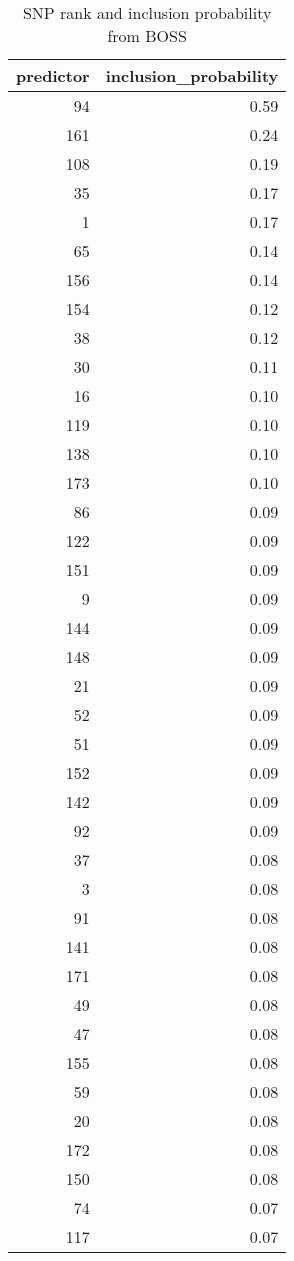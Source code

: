 \begin{longtable}{rr}
\caption{SNP rank and inclusion probability from BOSS\label{tab:rank}} \\ 
 predictor & inclusion\_probability \\ 
  \hline
 94 & 0.59 \\ 
  161 & 0.24 \\ 
  108 & 0.19 \\ 
   35 & 0.17 \\ 
    1 & 0.17 \\ 
   65 & 0.14 \\ 
  156 & 0.14 \\ 
  154 & 0.12 \\ 
   38 & 0.12 \\ 
   30 & 0.11 \\ 
   16 & 0.10 \\ 
  119 & 0.10 \\ 
  138 & 0.10 \\ 
  173 & 0.10 \\ 
   86 & 0.09 \\ 
  122 & 0.09 \\ 
  151 & 0.09 \\ 
    9 & 0.09 \\ 
  144 & 0.09 \\ 
  148 & 0.09 \\ 
   21 & 0.09 \\ 
   52 & 0.09 \\ 
   51 & 0.09 \\ 
  152 & 0.09 \\ 
  142 & 0.09 \\ 
   92 & 0.09 \\ 
   37 & 0.08 \\ 
    3 & 0.08 \\ 
   91 & 0.08 \\ 
  141 & 0.08 \\ 
  171 & 0.08 \\ 
   49 & 0.08 \\ 
   47 & 0.08 \\ 
  155 & 0.08 \\ 
   59 & 0.08 \\ 
   20 & 0.08 \\ 
  172 & 0.08 \\ 
  150 & 0.08 \\ 
   74 & 0.07 \\ 
  117 & 0.07 \\ 

\end{longtable}

